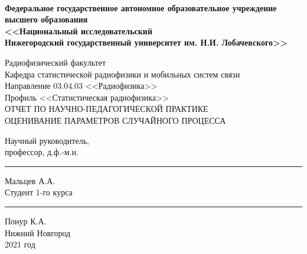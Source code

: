 
\begin{titlepage}
\begin{spacing}{1}
	\fontsize{11pt}{11pt} \selectfont
	{\centering
	\linespread{1}
	\\[13pt]
	\begin{spacing}{1.5}
		{\fontsize{12pt}{12pt} \selectfont\bf  Федеральное государственное автономное образовательное учреждение \\[-0.27em]
		высшего образования \\[-0.3em]
		<<Национальный исследовательский \\[-0.72em] Нижегородский
		государственный университет им. Н.И. Лобачевского>>
		}\\[4.5pt] 
	\end{spacing}
	\fontsize{12pt}{12pt} \selectfont
	Радиофизический факультет\\
    Кафедра статистической радиофизики и мобильных систем связи \\[1em]
	Направление 03.04.03 <<Радиофизика>>\\
	Профиль <<Статистическая радиофизика>>\\
    \vfill
	ОТЧЕТ ПО НАУЧНО-ПЕДАГОГИЧЕСКОЙ ПРАКТИКЕ\\
	\vspace{34pt}
	{{
            ОЦЕНИВАНИЕ ПАРАМЕТРОВ СЛУЧАЙНОГО ПРОЦЕССА
	}}\\

	\vspace{34pt}}\fontsize{12pt}{12pt} \selectfont
    \vfill
	\noindent Научный руководитель,\\[0.4em]
	профессор, д.ф.-м.н. \hfill \rule{2cm}{1pt} Мальцев А.А. \hphantom{aa\!a}\\[15pt]
	Студент 1-го курса \hfill \rule{2cm}{1pt} Понур К.А.
    \hphantom{\,\,\,aaa}\\[15pt]
	\vfill
	\centering
	Нижний Новгород\\[0.4em]
	2021 год
\end{spacing}
\end{titlepage}
\clearpage
\restoregeometry
